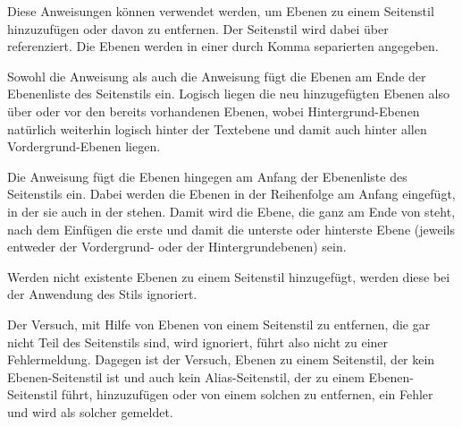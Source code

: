 \begin{Declaration}
\end{Declaration}
%
%
Diese Anweisungen können verwendet werden, um Ebenen zu einem Seitenstil
hinzuzufügen oder davon zu entfernen. Der Seitenstil wird dabei über
 referenziert. Die Ebenen werden in einer durch Komma
separierten  angegeben.

Sowohl die Anweisung  als auch die Anweisung
 fügt die Ebenen
am Ende der Ebenenliste des Seitenstils ein. Logisch liegen die neu
hinzugefügten Ebenen also über oder vor den bereits vorhandenen Ebenen, wobei
Hintergrund-Ebenen natürlich weiterhin logisch hinter der Textebene und damit
auch hinter allen Vordergrund-Ebenen liegen.

Die Anweisung  fügt die Ebenen hingegen am Anfang der Ebenenliste des Seitenstils
ein. Dabei werden die Ebenen in der Reihenfolge am Anfang eingefügt, in der
sie auch in der  stehen. Damit wird die Ebene, die ganz am
Ende von  steht, nach dem Einfügen die erste und damit die
unterste oder hinterste Ebene (jeweils entweder der Vordergrund- oder der
Hintergrundebenen) sein.

Werden nicht existente Ebenen zu einem Seitenstil
hinzugefügt, werden diese bei der Anwendung des Stils ignoriert.

Der Versuch, mit Hilfe von
 Ebenen von einem
Seitenstil zu entfernen, die gar nicht Teil des Seitenstils sind, wird
ignoriert, führt also nicht zu einer Fehlermeldung. Dagegen ist der Versuch,
Ebenen zu einem Seitenstil, der kein Ebenen-Seitenstil ist und auch kein
Alias-Seitenstil, der zu einem Ebenen-Seitenstil führt, hinzuzufügen oder von
einem solchen zu entfernen, ein Fehler und wird als solcher gemeldet.%
\EndIndexGroup


